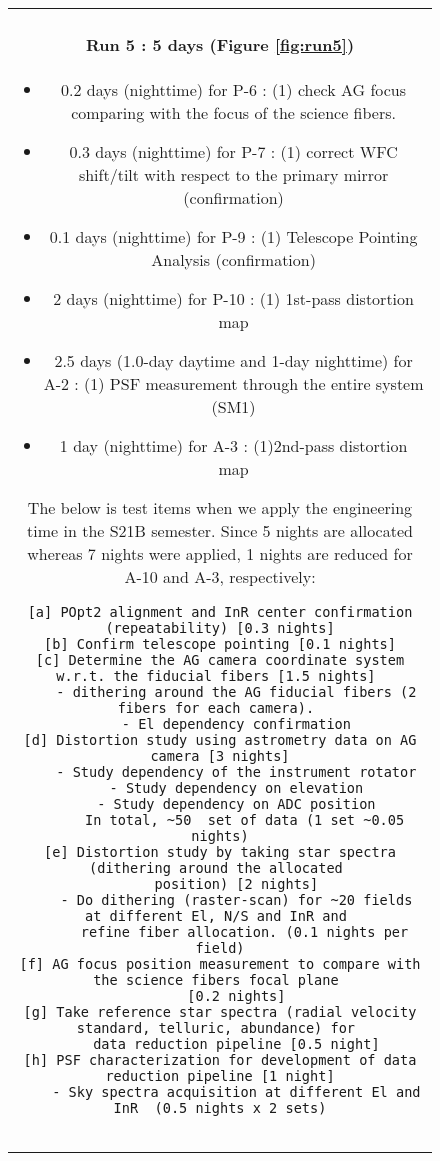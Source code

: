 \begin{figure}[!ht]
\begin{center}
\begin{tabular}{c}
\begin{minipage}{0.95\hsize}
\paragraph{Run 5 : 5 days  (Figure \ref{fig:run5})}
	\begin{itemize}
	\item 0.2 days (nighttime) for P-6 :
	(1) check AG focus comparing with the focus of the science fibers.
	\item 0.3 days (nighttime) for P-7 :
	(1) correct WFC shift/tilt with respect to the primary mirror (confirmation)
	\item 0.1 days (nighttime) for P-9 :
	(1) Telescope Pointing Analysis (confirmation)
	\item 2 days (nighttime) for P-10 : 
	(1) 1st-pass distortion map
	\item 2.5 days (1.0-day daytime and 1-day nighttime) for A-2 : 
	(1) PSF measurement through the entire system (SM1)
	\item 1 day (nighttime) for A-3 : 
	(1)2nd-pass distortion map
	\end{itemize}
The below is test items when we apply the engineering time in the S21B semester.
Since 5 nights are allocated whereas 7 nights were applied, 1 nights are reduced for A-10 and A-3, respectively:
\begin{verbatim}
[a] POpt2 alignment and InR center confirmation (repeatability) [0.3 nights]
[b] Confirm telescope pointing [0.1 nights]
[c] Determine the AG camera coordinate system w.r.t. the fiducial fibers [1.5 nights] 
    - dithering around the AG fiducial fibers (2 fibers for each camera). 
    - El dependency confirmation
[d] Distortion study using astrometry data on AG camera [3 nights]
    - Study dependency of the instrument rotator
    - Study dependency on elevation
    - Study dependency on ADC position
      In total, ~50  set of data (1 set ~0.05 nights)
[e] Distortion study by taking star spectra (dithering around the allocated 
    position) [2 nights]
    - Do dithering (raster-scan) for ~20 fields at different El, N/S and InR and 
      refine fiber allocation. (0.1 nights per field)
[f] AG focus position measurement to compare with the science fibers focal plane 
    [0.2 nights]
[g] Take reference star spectra (radial velocity standard, telluric, abundance) for 
    data reduction pipeline [0.5 night]
[h] PSF characterization for development of data reduction pipeline [1 night]
    - Sky spectra acquisition at different El and InR  (0.5 nights x 2 sets)


\end{verbatim}
\end{minipage}
\end{tabular}
\end{center}
\end{figure}

